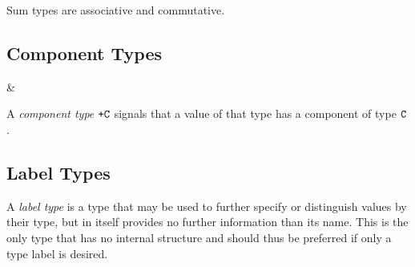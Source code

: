 Sum types are associative and commutative.


\subsection{Component Types}

\begin{grammar}
 &\produce {}
\end{grammar}

\noindent A \textit{component type} $\texttt{+C}$ signals that a value of that type has a component of type $\texttt{C}$.


\subsection{Label Types}

\noindent A \textit{label type} is a type that may be used to further specify or distinguish values by their type, but in itself provides no further information than its name. This is the only type that has no internal structure and should thus be preferred if only a type label is desired.


